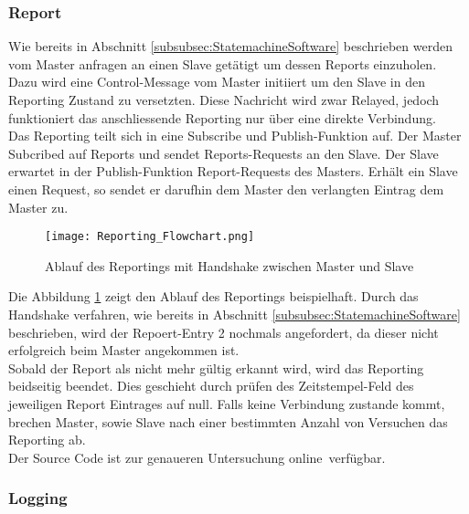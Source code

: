 \subsubsection{Report}\label{subsubsec:Report}

Wie bereits in Abschnitt \ref{subsubsec:StatemachineSoftware} beschrieben werden vom Master anfragen an einen Slave getätigt um dessen Reports einzuholen. Dazu wird eine Control-Message vom Master initiiert um den Slave in den Reporting Zustand zu versetzten. Diese Nachricht wird zwar Relayed, jedoch funktioniert das anschliessende Reporting nur über eine direkte Verbindung. \\

Das Reporting teilt sich in eine Subscribe und Publish-Funktion auf. Der Master Subcribed auf Reports und sendet Reports-Requests an den Slave. Der Slave erwartet in der Publish-Funktion Report-Requests des Masters. Erhält ein Slave einen Request, so sendet er darufhin dem Master den verlangten Eintrag dem Master zu. \\

\begin{figure}[H]
	\centering
	\texttt{[image: Reporting\_Flowchart.png]}
	\caption{Ablauf des Reportings mit Handshake zwischen Master und Slave}\label{fig:ReportingAblauf}
\end{figure}

Die Abbildung \ref{fig:ReportingAblauf} zeigt den Ablauf des Reportings beispielhaft. Durch das Handshake verfahren, wie bereits in Abschnitt \ref{subsubsec:StatemachineSoftware} beschrieben, wird der Repoert-Entry 2 nochmals angefordert, da dieser nicht erfolgreich beim Master angekommen ist. \\

Sobald der Report als nicht mehr gültig erkannt wird, wird das Reporting beidseitig beendet. Dies geschieht durch prüfen des Zeitstempel-Feld des jeweiligen Report Eintrages auf null. Falls keine Verbindung zustande kommt, brechen Master, sowie Slave nach einer bestimmten Anzahl von Versuchen das Reporting ab. \\


Der Source Code ist zur genaueren Untersuchung online\footnotemark\ verfügbar. 


\subsubsection{Logging}\label{subsubsec:Logging}

